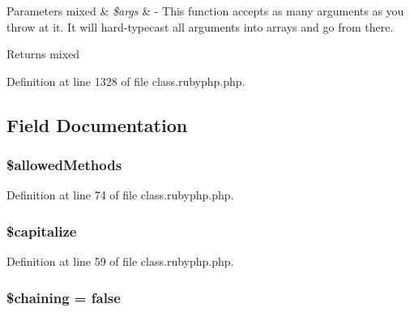 \begin{DoxyParams}[1]{Parameters}
mixed & {\em \$args} & -\/ This function accepts as many arguments as you throw at it. It will hard-\/typecast all arguments into arrays and go from there. \\
\hline
\end{DoxyParams}
\begin{DoxyReturn}{Returns}
mixed 
\end{DoxyReturn}


Definition at line 1328 of file class.\-rubyphp.\-php.



\subsection{Field Documentation}
\hypertarget{class_pierce_moore_1_1_ruby_p_h_p_1_1r_ab278eba7cab5341dacdccecd7a2cc2df}{
\subsubsection[{\$allowed\-Methods}]{\setlength{\rightskip}{0pt plus 5cm}\$allowed\-Methods}}\label{class_pierce_moore_1_1_ruby_p_h_p_1_1r_ab278eba7cab5341dacdccecd7a2cc2df}


Definition at line 74 of file class.\-rubyphp.\-php.

\hypertarget{class_pierce_moore_1_1_ruby_p_h_p_1_1r_a41c83fecb936997f3e2dae40207e31dd}{
\subsubsection[{\$capitalize}]{\setlength{\rightskip}{0pt plus 5cm}\$capitalize}}\label{class_pierce_moore_1_1_ruby_p_h_p_1_1r_a41c83fecb936997f3e2dae40207e31dd}


Definition at line 59 of file class.\-rubyphp.\-php.

\hypertarget{class_pierce_moore_1_1_ruby_p_h_p_1_1r_a793ad5be4c3ef761cb7096cff62f617a}{
\subsubsection[{\$chaining}]{\setlength{\rightskip}{0pt plus 5cm}\$chaining = false}}\label{class_pierce_moore_1_1_ruby_p_h_p_1_1r_a793ad5be4c3ef761cb7096cff62f617a}


